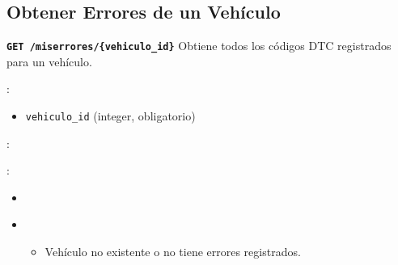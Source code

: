 \documentclass[a4paper,11pt,spanish]{sphinxmanual}
\newcommand{\robotoMonoBold}{\fontseries{b}\selectfont\ttfamily}
\renewcommand{\sphinxcode}[1]{\textcolor{sphinxorangeCode}{{\robotoMonoBold #1}}}
\renewcommand{\sphinxbfcode}[1]{\textbf{\sphinxcode{#1}}}
\renewcommand{\sphinxupquote}[1]{\texttt{#1}}
\begin{document}
\subsection{Obtener Errores de un Vehículo}
\label{\detokenize{endpoints:obtener-errores-de-un-vehiculo}}

\begin{fulllineitems}
\label{\detokenize{endpoints:get--mis-errores-vehiculo_id}}
\pysigstartsignatures
\pysigline
{\sphinxbfcode{\sphinxupquote{GET~}}\sphinxbfcode{\sphinxupquote{/mis\sphinxhyphen{}errores/\{vehiculo\_id\}}}}
\pysigstopsignatures
\sphinxAtStartPar
Obtiene todos los códigos DTC registrados para un vehículo.

\sphinxAtStartPar
{}:
\begin{itemize}
\item {} 
\sphinxAtStartPar
\sphinxcode{\sphinxupquote{vehiculo\_id}} (integer, obligatorio)

\end{itemize}

\sphinxAtStartPar
{}:

\begin{sphinxVerbatim}[commandchars=\\\{\}]
  
 
 
\end{sphinxVerbatim}

\sphinxAtStartPar
{}:
\begin{itemize}
\item {} 
\sphinxAtStartPar
{}

\begin{sphinxVerbatim}[commandchars=\\\{\}]
\PYG{p}{[}\PYG{p}{]}
\end{sphinxVerbatim}

\item {} 
\sphinxAtStartPar
{}
\begin{itemize}
\item {} 
\sphinxAtStartPar
Vehículo no existente o no tiene errores registrados.

\end{itemize}


\end{itemize}
\end{fulllineitems}
\end{document}
